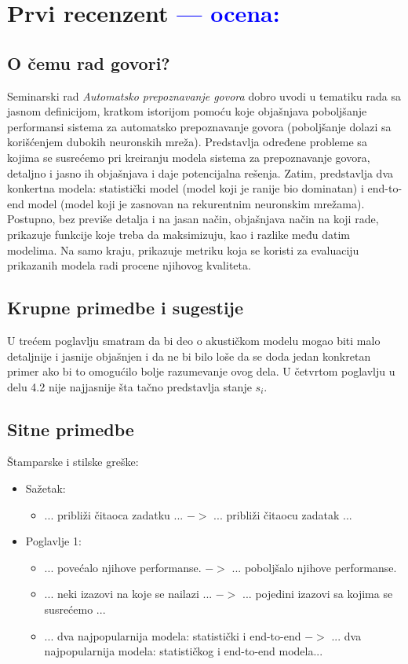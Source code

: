 \documentclass[a4paper]{report}
\newcommand{\odgovor}[1]{\textcolor{blue}{#1}}
\begin{document}
\chapter{Prvi recenzent \odgovor{--- ocena:} }
\section{O čemu rad govori?}
Seminarski rad \emph{Automatsko prepoznavanje govora} dobro uvodi u tematiku rada sa jasnom definicijom, kratkom istorijom pomoću koje objašnjava poboljšanje performansi sistema za automatsko prepoznavanje govora (poboljšanje dolazi sa korišćenjem dubokih neuronskih mreža). Predstavlja određene probleme sa kojima se susrećemo pri kreiranju modela sistema za prepoznavanje govora, detaljno i jasno ih objašnjava i daje potencijalna rešenja. Zatim, predstavlja dva konkertna modela: statistički model (model koji je ranije bio dominatan) i end-to-end model (model koji je zasnovan na rekurentnim neuronskim mrežama). Postupno, bez previše detalja i na jasan način, objašnjava način na koji rade, prikazuje funkcije koje treba da maksimizuju, kao i razlike među datim modelima. Na samo kraju, prikazuje metriku koja se koristi za evaluaciju prikazanih modela radi procene njihovog kvaliteta.

\section{Krupne primedbe i sugestije}
U trećem poglavlju smatram da bi deo o akustičkom modelu mogao biti malo detaljnije i jasnije objašnjen i da ne bi bilo loše da se doda jedan konkretan primer ako bi to omogućilo bolje razumevanje ovog dela. U četvrtom poglavlju u delu 4.2 nije najjasnije šta tačno predstavlja stanje $s_i$.

\section{Sitne primedbe}
Štamparske i stilske greške:
\begin{itemize}
  \item Sažetak:
  \begin{itemize}
  \item ... približi čitaoca zadatku ... $->$ ... približi čitaocu zadatak ...
 \end{itemize}
\end{itemize}

\begin{itemize}
  \item Poglavlje 1:
  \begin{itemize}
  \item ... povećalo njihove performanse. $->$ ... poboljšalo njihove performanse.
  \item ... neki izazovi na koje se nailazi ... $->$ ... pojedini izazovi sa kojima se susrećemo ...
  \item ... dva najpopularnija modela: statistički i end-to-end $->$ ... dva najpopularnija modela: statističkog i end-to-end modela...
 \end{itemize}
\end{itemize}
\end{document}
